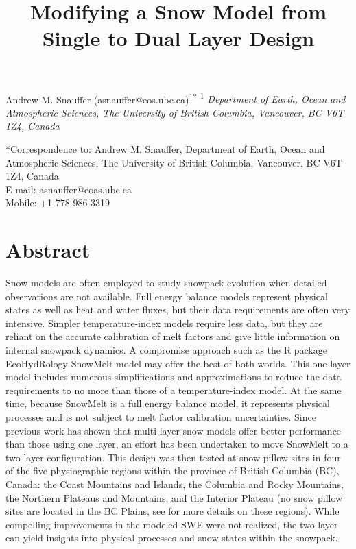 \documentclass[12pt]{article}
\title{Modifying a Snow Model from Single to Dual Layer Design}
\author{}
\date{}
\begin{document}
\maketitle
\begin{center}
Andrew M. Snauffer (asnauffer@eos.ubc.ca)\textsuperscript{1*}
\newline
\newline
\footnotesize{
\textsuperscript{1}\textit{
Department of Earth, Ocean and Atmospheric Sciences,
The University of British Columbia,
Vancouver, BC V6T 1Z4,
Canada}
}
\end{center}

\begin{footnotesize}
\noindent
*Correspondence to: Andrew M. Snauffer, 
Department of Earth, Ocean and Atmospheric Sciences,
The University of British Columbia,
Vancouver, BC V6T 1Z4,
Canada
\\E-mail: asnauffer@eoas.ubc.ca
\\Mobile: +1-778-986-3319

\end{footnotesize}

\newpage

\section{Abstract}
Snow models are often employed to study snowpack evolution when detailed observations are not available.
Full energy balance models represent physical states as well as heat and water fluxes, but their data requirements are often very intensive.
Simpler temperature-index models require less data, but they are reliant on the accurate calibration of melt factors and give little information on internal snowpack dynamics.
A compromise approach such as the R package EcoHydRology SnowMelt model may offer the best of both worlds.
This one-layer model includes numerous simplifications and approximations to reduce the data requirements to no more than those of a temperature-index model.
At the same time, because SnowMelt is a full energy balance model, it represents physical processes and is not subject to melt factor calibration uncertainties.
Since previous work has shown that multi-layer snow models offer better performance than those using one layer, an effort has been undertaken to move SnowMelt to a two-layer configuration.
This design was then tested at snow pillow sites in four of the five physiographic regions within the province of British Columbia (BC), Canada: the Coast Mountains and Islands, the Columbia and Rocky Mountains, the Northern Plateaus and Mountains, and the Interior Plateau (no snow pillow sites are located in the BC Plains, see \citet{holland1964landforms,bcmof1994} for more details on these regions).
While compelling improvements in the modeled SWE were not realized, the two-layer can yield insights into physical processes and snow states within the snowpack.
\end{document}

